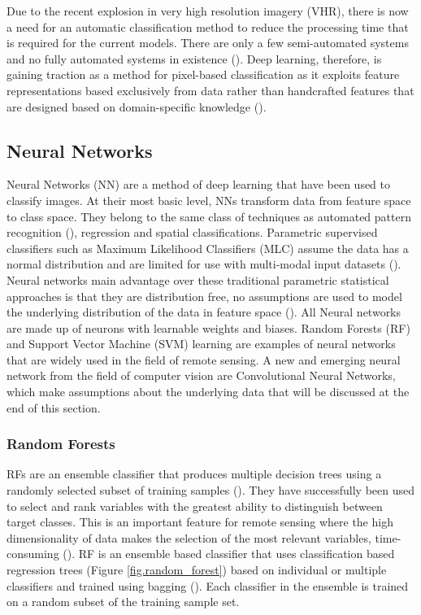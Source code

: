 \par
Due to the recent explosion in very high resolution imagery (VHR), there is now a need for an automatic classification method to reduce the processing time that is required for the current models. There are only a few semi-automated systems and no fully automated systems in existence (\cite{baltsavias04,mayer08,mnih13}). Deep learning, therefore, is gaining traction as a method for pixel-based classification as it exploits feature representations based exclusively from data rather than handcrafted features that are designed based on domain-specific knowledge (\cite{xiao17,maggiori17a}). 
\paragraph{}
\subsection*{Neural Networks}
Neural Networks (NN) are a method of deep learning that have been used to classify images. At their most basic level, NNs transform data from feature space to class space. They belong to the same class of techniques as automated pattern recognition (\cite{Ritter89}), regression and spatial classifications. Parametric supervised classifiers such as Maximum Likelihood Classifiers (MLC) assume the data has a normal distribution and are limited for use with multi-modal input datasets (\cite{Liu11}). Neural networks main advantage over these traditional parametric statistical approaches is that they are distribution free, no assumptions are used to model the underlying distribution of the data in feature space (\cite{Patricia97}). All Neural networks are made up of neurons with learnable weights and biases. Random Forests (RF) and Support Vector Machine (SVM) learning are examples of neural networks that are widely used in the field of remote sensing. A new and emerging neural network from the field of computer vision are Convolutional Neural Networks, which make assumptions about the underlying data that will be discussed at the end of this section. 
\subsubsection{Random Forests}
RFs are an ensemble classifier that produces multiple decision trees using a randomly selected subset of training samples (\cite{Breiman01}). They have successfully been used to select and rank variables with the greatest ability to distinguish between target classes. This is an important feature for remote sensing where the high dimensionality of data makes the selection of the most relevant variables, time-consuming (\cite{belgiu16}). RF is an ensemble based classifier that uses classification based regression trees (Figure \ref{fig.random_forest}) based on individual or multiple classifiers and trained using bagging (\cite{belgiu16}). Each classifier in the ensemble is trained on a random subset of the training sample set.

